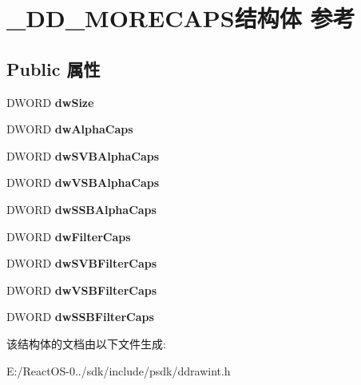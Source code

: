 \hypertarget{struct___d_d___m_o_r_e_c_a_p_s}{}\section{\+\_\+\+D\+D\+\_\+\+M\+O\+R\+E\+C\+A\+P\+S结构体 参考}
\label{struct___d_d___m_o_r_e_c_a_p_s}
\subsection*{Public 属性}
\begin{DoxyCompactItemize}
\item 
\mbox{\label{struct___d_d___m_o_r_e_c_a_p_s_aa230bf96bb13632d4772026f7894d3b7}} 
D\+W\+O\+RD {\bfseries dw\+Size}
\item 
\mbox{\label{struct___d_d___m_o_r_e_c_a_p_s_acdf7ece9640a755449adf24f7f00a8a6}} 
D\+W\+O\+RD {\bfseries dw\+Alpha\+Caps}
\item 
\mbox{\label{struct___d_d___m_o_r_e_c_a_p_s_a8da18539ec62249b91af48c47b658e14}} 
D\+W\+O\+RD {\bfseries dw\+S\+V\+B\+Alpha\+Caps}
\item 
\mbox{\label{struct___d_d___m_o_r_e_c_a_p_s_ad52c643f12a202ca62e2598403fbdb02}} 
D\+W\+O\+RD {\bfseries dw\+V\+S\+B\+Alpha\+Caps}
\item 
\mbox{\label{struct___d_d___m_o_r_e_c_a_p_s_a851ace9b930f538a25cafb03463c4abe}} 
D\+W\+O\+RD {\bfseries dw\+S\+S\+B\+Alpha\+Caps}
\item 
\mbox{\label{struct___d_d___m_o_r_e_c_a_p_s_ac5b464c855b6b827accae1752c633989}} 
D\+W\+O\+RD {\bfseries dw\+Filter\+Caps}
\item 
\mbox{\label{struct___d_d___m_o_r_e_c_a_p_s_a439d93ab6791f5b7bed0298f5bd74c01}} 
D\+W\+O\+RD {\bfseries dw\+S\+V\+B\+Filter\+Caps}
\item 
\mbox{\label{struct___d_d___m_o_r_e_c_a_p_s_a95d804a6c47a5b1628e90316401c1768}} 
D\+W\+O\+RD {\bfseries dw\+V\+S\+B\+Filter\+Caps}
\item 
\mbox{\label{struct___d_d___m_o_r_e_c_a_p_s_a58121c67ba07d0cce365deceb59746c0}} 
D\+W\+O\+RD {\bfseries dw\+S\+S\+B\+Filter\+Caps}
\end{DoxyCompactItemize}


该结构体的文档由以下文件生成\+:\begin{DoxyCompactItemize}
\item 
E\+:/\+React\+O\+S-\/0../sdk/include/psdk/ddrawint.\+h\end{DoxyCompactItemize}
